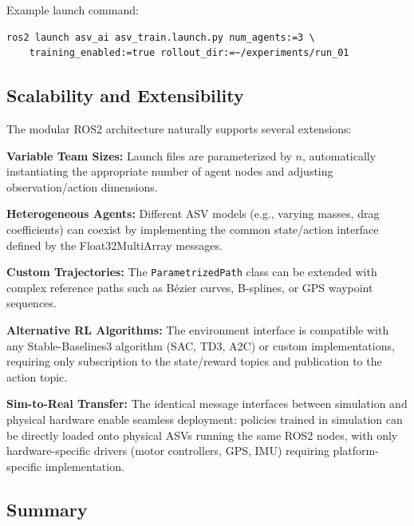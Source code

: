 \documentclass[preprint,3p]{elsarticle}
\begin{document}
Example launch command:
\begin{verbatim}
ros2 launch asv_ai asv_train.launch.py num_agents:=3 \
    training_enabled:=true rollout_dir:=~/experiments/run_01
\end{verbatim}

\subsection{Scalability and Extensibility}

The modular ROS2 architecture naturally supports several extensions:

\vspace{1em}

\textbf{Variable Team Sizes:} Launch files are parameterized by $n$, automatically instantiating the appropriate number of agent nodes and adjusting observation/action dimensions.

\vspace{1em}

\textbf{Heterogeneous Agents:} Different ASV models (e.g., varying masses, drag coefficients) can coexist by implementing the common state/action interface defined by the Float32MultiArray messages.

\vspace{1em}

\textbf{Custom Trajectories:} The \texttt{ParametrizedPath} class can be extended with complex reference paths such as Bézier curves, B-splines, or GPS waypoint sequences.

\vspace{1em}

\textbf{Alternative RL Algorithms:} The environment interface is compatible with any Stable-Baselines3 algorithm (SAC, TD3, A2C) or custom implementations, requiring only subscription to the state/reward topics and publication to the action topic.

\vspace{1em}

\textbf{Sim-to-Real Transfer:} The identical message interfaces between simulation and physical hardware enable seamless deployment: policies trained in simulation can be directly loaded onto physical ASVs running the same ROS2 nodes, with only hardware-specific drivers (motor controllers, GPS, IMU) requiring platform-specific implementation.

\subsection{Summary}
\end{document}
